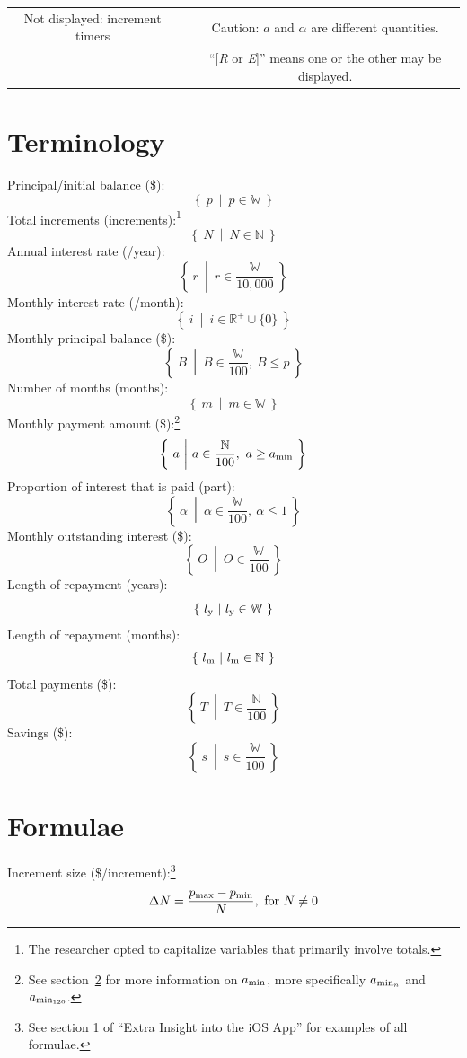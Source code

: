 \documentclass[12pt,letterpaper,oneside]{article}
\theoremstyle{remark} %
\begin{document}
\begin{table}[H]
{\begin{minipage}{1.25\textwidth}
\begin{tabular}{c c c}
					Not displayed: increment timers & \qquad\qquad & Caution: $a$ and $\alpha$ are different quantities. \\
					& & ``[\textit{R} or \textit{E}]'' means one or the other may be displayed. \\
				\end{tabular}
			\end{minipage}
		}
	\end{table}

	\newpage

\section{Terminology}

	Principal/initial balance (\$):
	$$\left\{\ p\ \middle|\ p\in\mathbb{W}\ \right\}$$
	Total increments (increments):\footnote{The researcher opted to capitalize variables that primarily involve totals.}
	$$\left\{\ N\ \middle|\ N\in\mathbb{N}\ \right\}$$
	Annual interest rate (/year):
	$$\left\{\ r\ \middle|\ r\in\frac{\mathbb{W}}{10,000}\ \right\}$$
	Monthly interest rate (/month):
	$$\left\{\ i\ \middle|\ i\in\mathbb{R}^{+}\cup\{0\}\ \right\}$$
	Monthly principal balance (\$):
	$$\left\{\ B\ \middle|\ B\in\frac{\mathbb{W}}{100},\ B\leq p\ \right\}$$
	Number of months (months):
	$$\left\{\ m\ \middle|\ m\in\mathbb{W}\ \right\}$$
	Monthly payment amount (\$):\footnote{See section~\ref{section2} for more information on $a_{\rm{min}}$, more specifically $a_{\rm{min_{\mathnormal{n}}}}$ and $a_{\rm{min_{120}}}$.}
	$$\left\{\ a\ \middle|\ a\in\frac{\mathbb{N}}{100},\ a\geq a_{\rm{min}}\ \right\}$$
	Proportion of interest that is paid (part):
	$$\left\{\ \alpha\ \middle|\ \alpha\in\frac{\mathbb{W}}{100},\ \alpha\leq 1\ \right\}$$
	Monthly outstanding interest (\$):
	$$\left\{\ O\ \middle|\ O\in\frac{\mathbb{W}}{100}\ \right\}$$
	Length of repayment (years):
	$$\left\{\ l_{\rm{y}}\ \middle|\ l_{\rm{y}}\in\mathbb{W}\ \right\}$$
	Length of repayment (months):
	$$\left\{\ l_{\rm{m}}\ \middle|\ l_{\rm{m}}\in\mathbb{N}\ \right\}$$
	Total payments (\$):
	$$\left\{\ T\ \middle|\ T\in\frac{\mathbb{N}}{100}\ \right\}$$
	Savings (\$):
	$$\left\{\ s\ \middle|\ s\in\frac{\mathbb{W}}{100}\ \right\}$$

	\newpage

\section{Formulae}\label{section2}

	Increment size (\$/increment):\footnote{See section 1 of ``Extra Insight into the iOS App'' for examples of all formulae.}
	$$\Delta N=\frac{p_{\rm{max}}-p_{\rm{min}}}{N},\mbox{ for }N\neq 0$$
\end{document}
